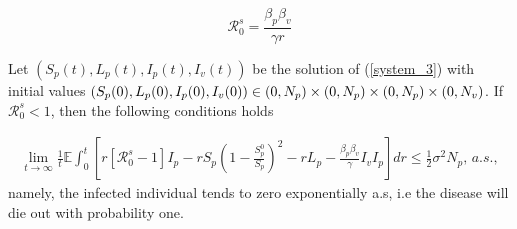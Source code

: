 \begin{equation}\label{eq5}
	\mathcal{R}_0^s=\frac{\beta_p\beta_v}{\gamma r}
\end{equation}

\begin{theorem}\label{theorem_2}
	Let $(S_p(t),L_p(t),I_p(t),I_v(t))$ be the solution of (\ref{system_3}) with initial values $(S_p(0),L_p(0),I_p(0),I_v(0))\in (0,N_p)\times(0,N_p)\times(0,N_p)\\\times(0,N_v)$. If $\mathcal{R}^s_0<1$, then the following conditions holds

	\begin{align*}
		\lim\limits_{t\rightarrow \infty}\frac{1}{t}\mathbb{E}\int_{0}^{t}\left[{r[\mathcal{R}^s_0-1]I_p-rS_p\left(1-\frac{S^0_p}{S_p}\right)^2-rL_p-\frac{\beta_p\beta_v}{\gamma}I_vI_p}\right]dr\leq \frac{1}{2}\sigma^2N_p,\, a.s.,
	\end{align*}
	namely, the infected individual tends to zero exponentially a.s, i.e the disease will die out with probability one.
\end{theorem}

